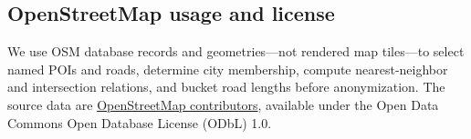 \documentclass[11pt]{article}
\begin{document}
\begin{table}[t]
\centering
{}
\caption{\textbf{Response-format composition.} Counts and within-split ratios
for training and paraphrase splits, with approximate chance EM for each split.
}
\label{tab:response-formats}
\end{table}

\subsection{OpenStreetMap usage and license}
\label{app:osm-license}
We use OSM database records and geometries---not rendered map tiles---to select
named POIs and roads, determine city membership, compute nearest-neighbor and
intersection relations, and bucket road lengths before anonymization. The source
data are \href{https://www.openstreetmap.org/copyright}{\textcopyright{}
OpenStreetMap contributors}, available under the Open Data Commons Open Database
License (ODbL) 1.0.
\end{document}
